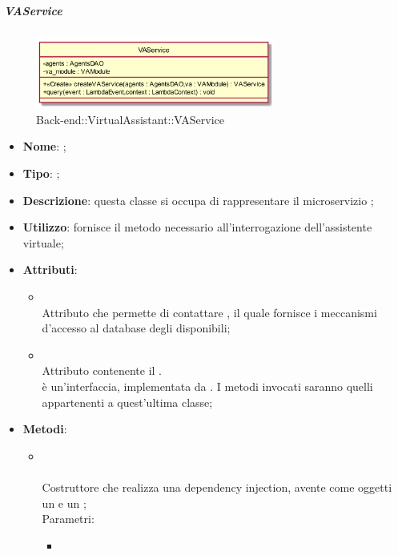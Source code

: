 \FloatBarrier

\hypertarget{VAService_label}{\subparagraph{VAService}}
\begin{figure}[h]
	\centering
	\includegraphics[width=0.70\textwidth,height=\textheight,keepaspectratio]{images/ClassVAService.png}
	\caption{Back-end::VirtualAssistant::VAService}
\end{figure}
\begin{itemize}
	\item \textbf{Nome}: ;
	\item \textbf{Tipo}: ;
	\item \textbf{Descrizione}: questa classe si occupa di rappresentare il microservizio ;
	\item \textbf{Utilizzo}: fornisce il metodo necessario all'interrogazione dell'assistente virtuale;
	\item \textbf{Attributi}:
	\begin{itemize}
		\item[]  \\
		Attributo che permette di contattare , il quale fornisce i meccanismi d'accesso al database degli  disponibili;
		\item[]  \\
		Attributo contenente il . \\
		 è un'interfaccia, implementata da .  I metodi invocati saranno quelli appartenenti a quest'ultima classe;
	\end{itemize}
	\item \textbf{Metodi}:
	\begin{itemize}
		\item[] \\ \\		Costruttore che realizza una dependency injection, avente come oggetti un  e un ;\\
		Parametri:
		\begin{itemize}
			\item {} \\

\end{itemize}
\end{itemize}
\end{itemize}
